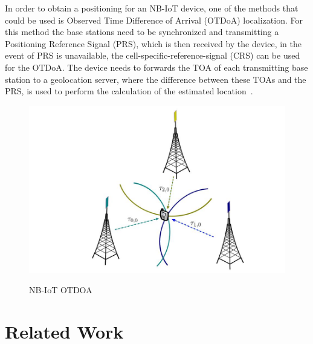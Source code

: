 \newline In order to obtain a positioning for an NB-IoT device, one of the methods that could be used is  Observed Time Difference of Arrival (OTDoA) localization. For this method the base stations need to be synchronized and transmitting  a Positioning Reference Signal (PRS), which is then received by the device, in the event of PRS is unavailable, the cell-specific-reference-signal (CRS) can be used for the OTDoA. The  device needs to forwards the TOA of each  transmitting base station to a geolocation server, where the difference between these TOAs and the PRS, is used to perform the calculation of the estimated location~\cite{Hu2017}.\newline

\begin{figure}[htbp]
  \centering
    {\includegraphics[width=0.65\linewidth]{Chapters/Figures/NBOTDOA.JPG}}%
  \caption{NB-IoT OTDOA~\cite{Hu2017}}
  \label{fig:NBOTDOA}
\end{figure}




\newpage
\section{Related Work} %
\label{sec:related_work}

